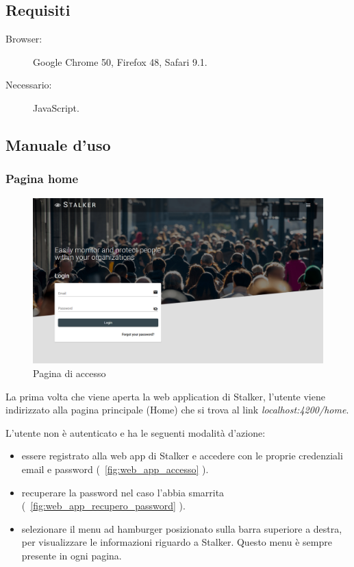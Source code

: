 \documentclass[../manuale-utente.tex]{subfiles}
\begin{document}
\subsection{Requisiti}%
\label{sub:requisiti}

\begin{description}
    \item[Browser:] Google Chrome 50, Firefox 48, Safari 9.1.
    \item[Necessario:] JavaScript.
\end{description}
\newpage

\subsection{Manuale d'uso}%
\label{sub:manuale-uso-web}

\subsubsection{Pagina home}%
\label{subs:pagina_home}

\begin{figure}[H]
    \centering
    \includegraphics[width=175mm]{img/web-app/pagina-home.png}
    \caption{Pagina di accesso}%
    \label{fig:web_app_pagina_accesso}
\end{figure}

La prima volta che viene aperta la web application di Stalker, l'utente viene indirizzato alla pagina principale (Home) che si trova al link \textit{localhost:4200/home}.

L'utente non è autenticato e ha le seguenti modalità d'azione:
\begin{itemize}
    \item essere registrato alla web app di Stalker e accedere con le proprie credenziali email e password (~\ref{fig:web_app_accesso} ).
    \item recuperare la password nel caso l'abbia smarrita (~\ref{fig:web_app_recupero_password} ).
    \item selezionare il menu ad hamburger posizionato sulla barra superiore a destra, per visualizzare le informazioni riguardo a Stalker. Questo menu è sempre presente in ogni pagina.
\end{itemize} 
\newpage
\end{document}

